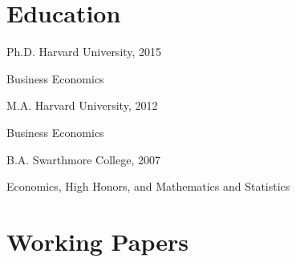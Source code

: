 \documentclass[letterpaper]{article}
\renewenvironment{itemize}{
  \begin{list}{}
    { \setlength{\itemsep}{5pt}
      \setlength{\parsep}{0pt}
      \setlength{\topsep}{0pt}
      \setlength{\leftmargin}{0em} } }{
  \end{list}}
\begin{document}
\section*{Education}

\begin{itemize}
\item Ph.D. Harvard University, 2015
  \begin{itemize}
  \item Business Economics
  \end{itemize}
\item M.A. Harvard University, 2012
  \begin{itemize}
  \item Business Economics
  \end{itemize}
\item B.A. Swarthmore College, 2007
  \begin{itemize}
  \item Economics, High Honors, and Mathematics and Statistics
  \end{itemize}
\end{itemize}



\section*{Working Papers}
\end{document}
